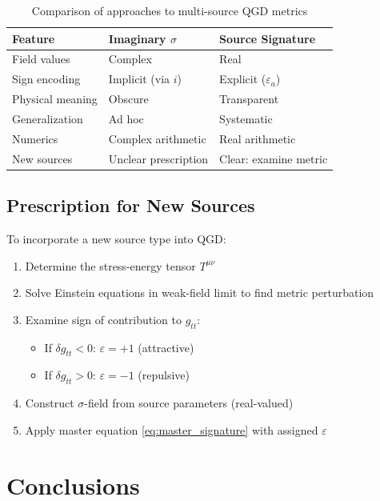 \documentclass[11pt,a4paper]{article}
\theoremstyle{definition}
\theoremstyle{remark}
\begin{document}
	\begin{table}[h]
		\centering
		\caption{Comparison of approaches to multi-source QGD metrics}
		\begin{tabular}{@{}lll@{}}
			\toprule
			\textbf{Feature} & \textbf{Imaginary $\sigma$} & \textbf{Source Signature} \\
			\midrule
			Field values & Complex & Real \\
			Sign encoding & Implicit (via $i$) & Explicit ($\varepsilon_a$) \\
			Physical meaning & Obscure & Transparent \\
			Generalization & Ad hoc & Systematic \\
			Numerics & Complex arithmetic & Real arithmetic \\
			New sources & Unclear prescription & Clear: examine metric \\
			\bottomrule
		\end{tabular}
	\end{table}
	
	\subsection{Prescription for New Sources}
	
	To incorporate a new source type into QGD:
	
	\begin{enumerate}
		\item Determine the stress-energy tensor $T^{\mu\nu}$
		\item Solve Einstein equations in weak-field limit to find metric perturbation
		\item Examine sign of contribution to $g_{tt}$:
		\begin{itemize}
			\item If $\delta g_{tt} < 0$: $\varepsilon = +1$ (attractive)
			\item If $\delta g_{tt} > 0$: $\varepsilon = -1$ (repulsive)
		\end{itemize}
		\item Construct $\sigma$-field from source parameters (real-valued)
		\item Apply master equation \eqref{eq:master_signature} with assigned $\varepsilon$
	\end{enumerate}
	
	\section{Conclusions}
	
\end{document}
